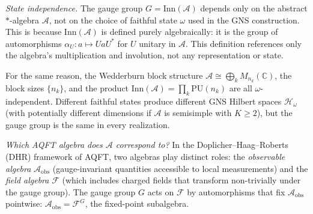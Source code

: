 \documentclass[11pt,a4paper]{article}
\theoremstyle{definition}
\begin{document}
\smallskip\noindent\textit{State independence.}\quad
The gauge group $G = \mathrm{Inn}(\mathcal{A})$ depends only on the
abstract $*$-algebra $\mathcal{A}$, not on the choice of faithful state
$\omega$ used in the GNS construction.  This is because
$\mathrm{Inn}(\mathcal{A})$ is defined purely algebraically: it is the
group of automorphisms $\alpha_U: a \mapsto UaU^*$ for $U$ unitary in
$\mathcal{A}$.  This definition references only the algebra's
multiplication and involution, not any representation or state.

For the same reason, the Wedderburn block structure
$\mathcal{A} \cong \bigoplus_k M_{n_k}(\mathbb{C})$, the block sizes
$\{n_k\}$, and the product $\mathrm{Inn}(\mathcal{A}) = \prod_k
\mathrm{PU}(n_k)$ are all $\omega$-independent.  Different faithful
states produce different GNS Hilbert spaces $\mathcal{H}_\omega$ (with
potentially different dimensions if $\mathcal{A}$ is semisimple with
$K \ge 2$), but the gauge group is the same in every realization.

\smallskip\noindent\textit{Which AQFT algebra does $\mathcal{A}$ correspond to?}\quad
In the Doplicher--Haag--Roberts (DHR) framework of AQFT, two algebras
play distinct roles: the \emph{observable algebra}
$\mathcal{A}_{\mathrm{obs}}$ (gauge-invariant quantities accessible to
local measurements) and the \emph{field algebra} $\mathcal{F}$ (which
includes charged fields that transform non-trivially under the gauge
group).  The gauge group $G$ acts on $\mathcal{F}$ by automorphisms
that fix $\mathcal{A}_{\mathrm{obs}}$ pointwise:
$\mathcal{A}_{\mathrm{obs}} = \mathcal{F}^G$, the fixed-point
subalgebra.
\end{document}
